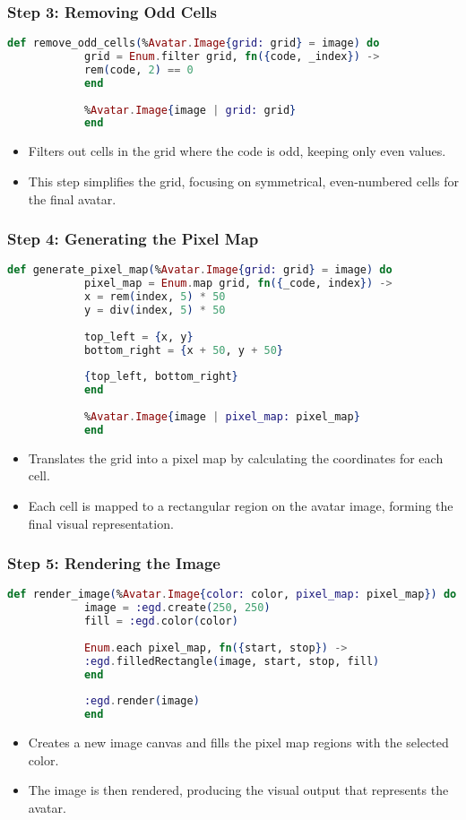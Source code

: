 \documentclass[aspectratio=169, table]{beamer}
\begin{document}
	\begin{frame}[fragile]
		\frametitle{Step 3: Removing Odd Cells}
		\begin{lstlisting}[language=Elixir]
			def remove_odd_cells(%Avatar.Image{grid: grid} = image) do
			grid = Enum.filter grid, fn({code, _index}) ->
			rem(code, 2) == 0
			end
			
			%Avatar.Image{image | grid: grid}
			end
		\end{lstlisting}
		\begin{itemize}
			\item Filters out cells in the grid where the code is odd, keeping only even values.
			\item This step simplifies the grid, focusing on symmetrical, even-numbered cells for the final avatar.
		\end{itemize}
	\end{frame}
	
	\begin{frame}[fragile]
		\frametitle{Step 4: Generating the Pixel Map}
		\begin{lstlisting}[language=Elixir]
			def generate_pixel_map(%Avatar.Image{grid: grid} = image) do
			pixel_map = Enum.map grid, fn({_code, index}) ->
			x = rem(index, 5) * 50
			y = div(index, 5) * 50
			
			top_left = {x, y}
			bottom_right = {x + 50, y + 50}
			
			{top_left, bottom_right}
			end
			
			%Avatar.Image{image | pixel_map: pixel_map}
			end
		\end{lstlisting}
		\begin{itemize}
			\item Translates the grid into a pixel map by calculating the coordinates for each cell.
			\item Each cell is mapped to a rectangular region on the avatar image, forming the final visual representation.
		\end{itemize}
	\end{frame}
	
	\begin{frame}[fragile]
		\frametitle{Step 5: Rendering the Image}
		\begin{lstlisting}[language=Elixir]
			def render_image(%Avatar.Image{color: color, pixel_map: pixel_map}) do
			image = :egd.create(250, 250)
			fill = :egd.color(color)
			
			Enum.each pixel_map, fn({start, stop}) ->
			:egd.filledRectangle(image, start, stop, fill)
			end
			
			:egd.render(image)
			end
		\end{lstlisting}
		\begin{itemize}
			\item Creates a new image canvas and fills the pixel map regions with the selected color.
			\item The image is then rendered, producing the visual output that represents the avatar.
		\end{itemize}
	\end{frame}
	
\end{document}
